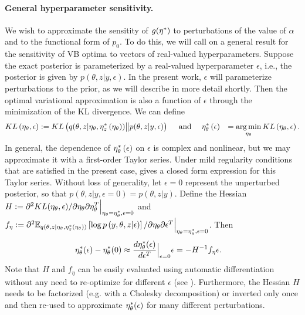 
\paragraph{General hyperparameter sensitivity.}
%
We wish to approximate the sensitity of $g(\eta^{*})$ to perturbations of the
value of $\alpha$ and to the functional form of $p_{0}$.  To do this, we will
call on a general result for the sensitivity of VB optima to vectors of
real-valued hyperparameters.  Suppose the exact posterior is parameterized by a
real-valued hyperparameter $\epsilon$, i.e., the posterior is given by
$p\left(\theta, z \vert y, \epsilon\right)$. In the present work, $\epsilon$
will parameterize perturbations to the prior, as we will describe in more detail
shortly.  Then the optimal variational approximation is also a function of
$\epsilon$ through the minimization of the KL divergence.  We can define
%
\begin{align}
KL\left(\eta_\theta, \epsilon\right) &:=
    KL\left(q(\theta, z \vert \eta_\theta, \etazopt\left(\eta_\theta\right))
    \big\| p(\theta, z | y, \epsilon) \right) %
\quad\textrm{ and }\quad
\etathetaopt\left(\epsilon\right) &=
    \argmin_{\eta_\theta} KL\left(\eta_\theta, \epsilon\right).
    \label{eq:pert_kl_objective}
\end{align}
%
In general, the dependence of $\eta_\theta^{*}\left(\epsilon\right)$ on $\epsilon$
is complex and nonlinear, but we may approximate it with a first-order Taylor
series. Under mild regularity conditions that are satisfied in the present case,
\citet[Theorem 2]{giordano:2017:covariances} gives a closed form expression for
this Taylor series. Without loss of generality, let $\epsilon=0$ represent the
unperturbed posterior, so that $p\left(\theta, z \vert y, \epsilon=0\right) =
p\left(\theta, z \vert y \right)$.
%
Define the Hessian
$H := \partial^2 KL(\eta_\theta, \epsilon) /
    \partial \eta_\theta \partial \eta_\theta^T
    \Big\rvert_{\eta_\theta = \eta_\theta^{*}, \epsilon = 0}$ and
$f_\eta := \partial^2
    \mathbb{E}_{q\left(\theta, z \vert \eta_\theta, \eta_z^{*}(\eta_\theta)\right)} \left[ \log p\left(y, \theta, z \vert \epsilon \right) \right]
    / \partial \eta_\theta \partial \epsilon^T
    \Big\rvert_{\eta_\theta = \eta_\theta^{*}, \epsilon = 0}$.
Then
%
\begin{align}
\eta_\theta^{*}(\epsilon)  -  \eta_\theta^{*}(0) &\approx
\frac{d \eta_\theta^{*}(\epsilon)}{d\epsilon^T}\Big|_{\epsilon=0} \epsilon =
- H^{-1} f_\eta \epsilon.
\label{eq:our_approximation}
\end{align}
%
Note that $H$ and $f_\eta$ can be easily evaluated using automatic
differentiation without any need to re-optimize for different $\epsilon$
\citep{maclaurin:2015:autograd} (see ).  Furthermore,
the Hessian $H$ needs to be factorized (e.g. with a Cholesky decomposition) or
inverted only once and then re-used to approximate $\eta_\theta^{*}(\epsilon)$ for
many different perturbations.

